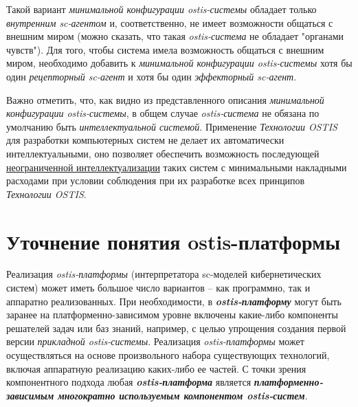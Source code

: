 Такой вариант \textit{минимальной конфигурации ostis-системы} обладает только \textit{внутренним sc-агентом} и, соответственно, не имеет возможности общаться с внешним миром (можно сказать, что такая \textit{ostis-система} не обладает "органами чувств"). Для того, чтобы система имела возможность общаться с внешним миром, необходимо добавить к \textit{минимальной конфигурации ostis-системы} хотя бы один \textit{рецепторный sc-агент} и хотя бы один \textit{эффекторный sc-агент}.

Важно отметить, что, как видно из представленного описания \textit{минимальной конфигурации ostis-системы}, в общем случае \textit{ostis-система} не обязана по умолчанию быть \textit{интеллектуальной системой}. Применение \textit{Технологии OSTIS} для разработки компьютерных систем не делает их автоматически интеллектуальными, оно позволяет обеспечить возможность последующей \uline{неограниченной интеллектуализации} таких систем с минимальными накладными расходами при условии соблюдения при их разработке всех принципов \textit{Технологии OSTIS}.

\section{Уточнение понятия ostis-платформы}

\begin{SCn}
\end{SCn}

Реализация \textit{ostis-платформы} (интерпретатора sc-моделей кибернетических систем) может иметь большое число вариантов -- как программно, так и аппаратно реализованных. При необходимости, в \textbf{\textit{ostis-платформу}} могут быть заранее на платформенно-зависимом уровне включены какие-либо компоненты решателей задач или баз знаний, например, с целью упрощения создания первой версии \textit{прикладной ostis-системы}. Реализация \textit{ostis-платформы} может осуществляться на основе произвольного набора существующих технологий, включая аппаратную реализацию каких-либо ее частей. С точки зрения компонентного подхода любая \textbf{\textit{ostis-платформа}} является \textbf{\textit{платформенно-зависимым многократно используемым компонентом ostis-систем}}.

